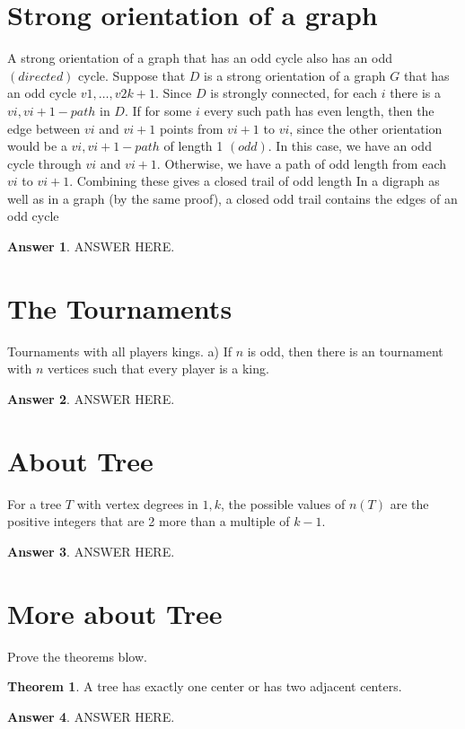 \documentclass[a4paper]{article}
\renewcommand{\(}{\left(}
\renewcommand{\)}{\right)}
\theoremstyle{plain}
\theoremstyle{plain}
\theoremstyle{definition}
\newtheorem*{answer}{Answer}
\newtheorem{theorem}{Theorem}[section]
\begin{document}
\section{Strong orientation of a graph}
A strong orientation of a graph that has an odd cycle also has an odd $(directed)$ cycle. Suppose that $D$ is a strong orientation of a graph $G$ that has an odd cycle $v1, \dots , v2k+1$. Since $D$ is strongly connected, for each $i$ there is a $vi, vi+1-path$ in $D$. If for some $i$ every such path has even length, then the edge between $vi$ and $vi+1$ points from $vi+1$ to $vi$, since the other orientation would be a $vi, vi+1-path$ of length 1 $(odd)$. In this case, we have an odd cycle through $vi$ and $vi+1$. Otherwise, we have a path of odd length from each $vi$ to $vi+1$. Combining these gives a closed trail of odd length In a digraph as well as in a graph (by the same proof), a closed odd trail contains the edges of an odd cycle
\begin{shaded}
\begin{answer}
ANSWER HERE.
\end{answer}
\end{shaded}

\section{The Tournaments}
Tournaments with all players kings.
 a) If $n$ is odd, then there is an tournament with $n$ vertices such that every player is a king.
\begin{shaded}
\begin{answer}
ANSWER HERE.
\end{answer}
\end{shaded}


\section{About Tree}
For a tree $T$ with vertex degrees in ${1, k}$, the possible values of $n(T)$ are the positive integers that are 2 more than a multiple of $k − 1$.
\begin{shaded}
\begin{answer}
ANSWER HERE.
\end{answer}
\end{shaded}



\section{More about Tree}
Prove the theorems blow.
\begin{theorem}
A tree has exactly one center or has two adjacent centers.
\end{theorem}
\begin{shaded}
\begin{answer}
ANSWER HERE.
\end{answer}
\end{shaded}
\end{document}
